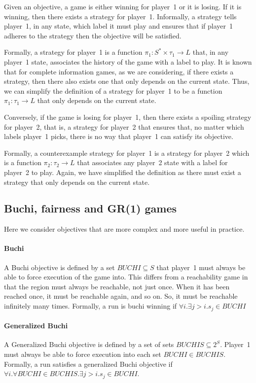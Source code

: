 \documentclass{book}
\theoremstyle{definition}
\begin{document}
Given an objective, a game is either winning for player~1 or it is losing. If it is winning, then there exists a strategy for player~1. Informally, a strategy tells player~1, in any state, which label it must play and ensures that if player~1 adheres to the strategy then the objective will be satisfied.

Formally, a strategy for player~1 is a function $\pi_1 : S^* \times \tau_1 \rightarrow L$ that, in any player~1 state, associates the history of the game with a label to play. It is known that for complete information games, as we are considering, if there exists a strategy, then there also exists one that only depends on the current state. Thus, we can simplify the definition of a strategy for player~1 to be a function $\pi_1 : \tau_1 \rightarrow L$ that only depends on the current state.

Conversely, if the game is losing for player~1, then there exists a spoiling strategy for player~2, that is, a strategy for player~2 that ensures that, no matter which labels player~1 picks, there is no way that player~1 can satisfy its objective.

Formally, a counterexample strategy for player~1 is a strategy for player~2 which is a function $\pi_2 : \tau_2 \rightarrow L$ that associates any player~2 state with a label for player~2 to play. Again, we have simplified the definition as there must exist a strategy that only depends on the current state. 

\subsection{Buchi, fairness and GR(1) games}
Here we consider objectives that are more complex and more useful in practice.

\paragraph{Buchi}
A Buchi objective is defined by a set $BUCHI \subseteq S$ that player~1 must always be able to force execution of the game into. This differs from a reachability game in that the region must always be reachable, not just once. When it has been reached once, it must be reachable again, and so on. So, it must be reachable infinitely many times. Formally, a run is buchi winning if $\forall i. \exists j>i. s_j \in BUCHI$

\paragraph{Generalized Buchi}
A Generalized Buchi objective is defined by a set of sets $BUCHIS \subseteq 2^S$. Player~1 must always be able to force execution into each set $BUCHI \in BUCHIS$. Formally, a run satisfies a generalized Buchi objective if $\forall i. \forall BUCHI \in BUCHIS. \exists j>i. s_j \in BUCHI$.
\end{document}
